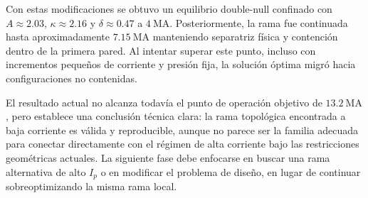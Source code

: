 \documentclass[11pt,a4paper]{article}
\begin{document}
Con estas modificaciones se obtuvo un equilibrio double-null confinado con $A\approx2.03$,
$\kappa\approx2.16$ y $\delta\approx0.47$ a $4~\mathrm{MA}$. Posteriormente, la rama fue
continuada hasta aproximadamente $7.15~\mathrm{MA}$ manteniendo separatriz física y contención
dentro de la primera pared. Al intentar superar este punto, incluso con incrementos pequeños
de corriente y presión fija, la solución óptima migró hacia configuraciones no contenidas.

El resultado actual no alcanza todavía el punto de operación objetivo de $13.2~\mathrm{MA}$,
pero establece una conclusión técnica clara: la rama topológica encontrada a baja corriente es
válida y reproducible, aunque no parece ser la familia adecuada para conectar directamente con
el régimen de alta corriente bajo las restricciones geométricas actuales. La siguiente fase debe
enfocarse en buscar una rama alternativa de alto $I_p$ o en modificar el problema de diseño,
en lugar de continuar sobreoptimizando la misma rama local.
\end{document}
